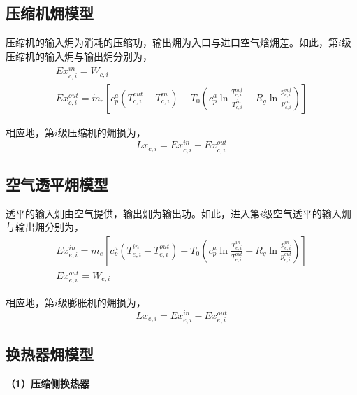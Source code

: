 \subsection{压缩机㶲模型}
压缩机的输入㶲为消耗的压缩功，输出㶲为入口与进口空气焓㶲差。如此，第$i$级压缩机的输入㶲与输出㶲分别为\cite{Eng-Thermo-83}，
\begin{subequations}
\label{eq:exergy-compressor}
\begin{gather}
Ex_{c,i}^{in} = {W_{c,i}}\label{equ:comp-exergy-in}\\
Ex_{c,i}^{out} = {\dot m_c}[ {c_p^a\left( {T_{c,i}^{out} - T_{c,i}^{in}} \right) - {T_0}({c_p^a\ln \frac{{T_{c,i}^{out}}}{{T_{c,i}^{in}}} - {R_g}\ln \frac{{p_{c,i}^{out}}}{{p_{c,i}^{in}}}})}]\label{equ:comp-exergy-out}
\end{gather}
\end{subequations}

相应地，第$i$级压缩机的㶲损为，
\begin{equation}
\label{equ:comp-exergy-loss}
L{x_{c,i}} = Ex_{c,i}^{in} - Ex_{c,i}^{out}
\end{equation}

\subsection{空气透平㶲模型}
透平的输入㶲由空气提供，输出㶲为输出功。如此，进入第$i$级空气透平的输入㶲与输出㶲分别为\cite{Eng-Thermo-83}，
\begin{subequations}
\begin{gather}
Ex_{e,i}^{in} = {\dot m_e}[ {c_p^a( {T_{e,i}^{in} - T_{e,i}^{out}}) - {T_0}({c_p^a\ln \frac{{T_{e,i}^{in}}}{{T_{e,i}^{out}}} - {R_g}\ln \frac{{p_{e,i}^{in}}}{{p_{e,i}^{out}}}})}]\label{equ:turb-exergy-in}\\
Ex_{e,i}^{out} = {W_{e,i}}\label{equ:turb-exergy-out}
\end{gather}
\end{subequations}

相应地，第$i$级膨胀机的㶲损为，
\begin{equation}
\label{equ:turb-exergy-loss}
L{x_{e,i}} = Ex_{e,i}^{in} - Ex_{e,i}^{out}
\end{equation}

\subsection{换热器㶲模型}

\textbf{（1）压缩侧换热器}

